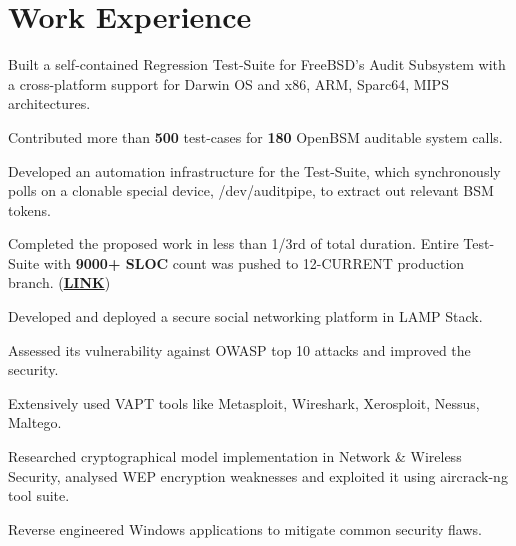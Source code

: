 \documentclass[]{deedy-resume-openfont}
\begin{document}
\begin{minipage}[t]{0.70\textwidth}

\vspace{-0.5cm}
\section{Work Experience}
\vspace{\topsep} %
\begin{tightemize}
\item Built a self-contained Regression Test-Suite for FreeBSD's Audit Subsystem with a cross-platform support for Darwin OS and x86, ARM, Sparc64, MIPS architectures.
  \item Contributed more than \textbf{500} test-cases for \textbf{180} OpenBSM auditable system calls.
  \item Developed an automation infrastructure for the Test-Suite, which synchronously polls on a clonable special device, /dev/auditpipe, to extract out relevant BSM tokens.
  \item	Completed the proposed work in less than 1/3rd of total duration. Entire Test-Suite with \textbf{9000+ SLOC} count was pushed to 12-CURRENT production branch. (\href{https://github.com/freebsd/freebsd/tree/master/tests/sys/audit}{\textbf{LINK}})
\end{tightemize}

\vspace{0.1cm}
\vspace{0cm} %
\begin{tightemize}
  \item Developed and deployed a secure social networking platform in LAMP Stack.
  \item Assessed its vulnerability against OWASP top 10 attacks and improved the security.
  \item Extensively used VAPT tools like Metasploit, Wireshark, Xerosploit, Nessus, Maltego.
  \item	Researched cryptographical model implementation in Network \& Wireless Security, analysed WEP encryption weaknesses and exploited it using aircrack-ng tool suite.
  \item Reverse engineered Windows applications to mitigate common security flaws.
\end{tightemize}


\end{minipage}
\end{document}
